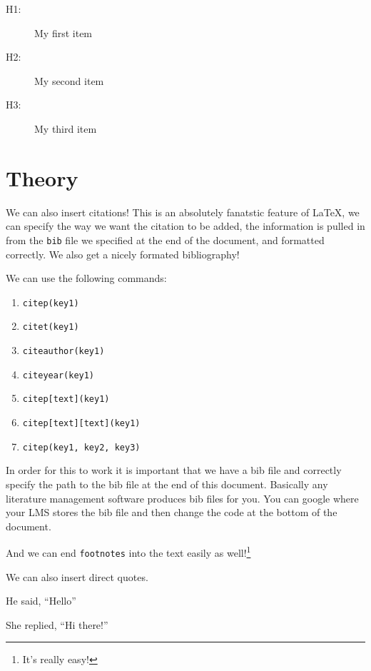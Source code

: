 \documentclass{article}
\begin{document}
\begin{description}
    \item[H1:] My first item
    \item[H2:] My second item
    \item[H3:] My third item
\end{description} 

\newpage
\section{Theory}
\label{sec:theory}

We can also insert citations! This is an absolutely fanatstic feature of \LaTeX, we can specify the way we want the citation to be added, the information is pulled in from the \texttt{bib} file we specified at the end of the document, and formatted correctly. We also get a nicely formated bibliography!

We can use the following commands:
\begin{enumerate}
    \item \texttt{citep(key1)} \citep{smith2020impact}
    \item \texttt{citet(key1)} \citet{smith2020impact}
    \item \texttt{citeauthor(key1)} \citeauthor{smith2020impact}
    \item \texttt{citeyear(key1)} \citeyear{smith2020impact}
    \item \texttt{citep[text](key1)} \citep[pp.20]{smith2020impact}
    \item \texttt{citep[text][text](key1)} \citep[for example][pp.20]{smith2020impact}
    \item \texttt{citep(key1, key2, key3)} \citep{smith2020impact,brown2018statistics,lee2019machine}
\end{enumerate}


In order for this to work it is important that we have a bib file and correctly specify the path to the bib file at the end of this document. Basically any literature management software produces bib files for you. You can google where your LMS stores the bib file and then change the code at the bottom of the document.


And we can end \texttt{footnotes} into the text easily as well!\footnote{It's really easy!}


We can also insert direct quotes. 

He said, ``Hello'' \citep[p. 10]{smith2020impact}

She replied, ``Hi there!''  \citep[p. 11]{smith2020impact}
\end{document}
